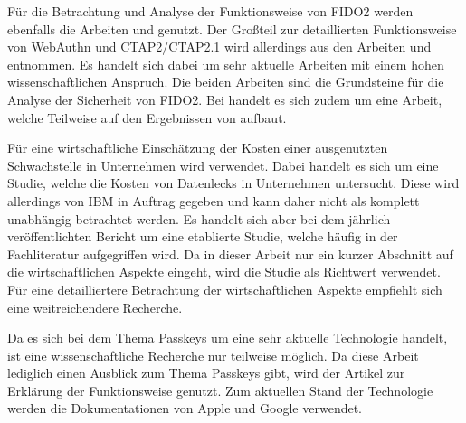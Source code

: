 Für die Betrachtung und Analyse der Funktionsweise von \ac{FIDO}2 werden ebenfalls die Arbeiten \cite{farke2020you} und \cite{lyastani2020fido2} genutzt. Der Großteil zur detaillierten Funktionsweise von WebAuthn und CTAP2/CTAP2.1 wird allerdings aus den Arbeiten \cite{barbosa2021provable} und \cite{bindel2022fido2} entnommen. Es handelt sich dabei um sehr aktuelle Arbeiten mit einem hohen wissenschaftlichen Anspruch. Die beiden Arbeiten sind die Grundsteine für die Analyse der Sicherheit von \ac{FIDO}2. Bei \cite{bindel2022fido2} handelt es sich zudem um eine Arbeit, welche Teilweise auf den Ergebnissen von \cite{barbosa2021provable} aufbaut.

Für eine wirtschaftliche Einschätzung der Kosten einer ausgenutzten Schwachstelle in Unternehmen wird \cite{databreach} verwendet. Dabei handelt es sich um eine Studie, welche die Kosten von Datenlecks in Unternehmen untersucht. Diese wird allerdings von IBM in Auftrag gegeben und kann daher nicht als komplett unabhängig betrachtet werden. Es handelt sich aber bei dem jährlich veröffentlichten Bericht um eine etablierte Studie, welche häufig in der Fachliteratur aufgegriffen wird. Da in dieser Arbeit nur ein kurzer Abschnitt auf die wirtschaftlichen Aspekte eingeht, wird die Studie als Richtwert verwendet. Für eine detailliertere Betrachtung der wirtschaftlichen Aspekte empfiehlt sich eine weitreichendere Recherche.

Da es sich bei dem Thema Passkeys um eine sehr aktuelle Technologie handelt, ist eine wissenschaftliche Recherche nur teilweise möglich. Da diese Arbeit lediglich einen Ausblick zum Thema Passkeys gibt, wird der Artikel \cite{usecasfido} zur Erklärung der Funktionsweise genutzt. Zum aktuellen Stand der Technologie werden die Dokumentationen von Apple \cite{passkeysapple} und Google \cite{passkeysgoogle} \cite{passkeysgoogledev} verwendet.